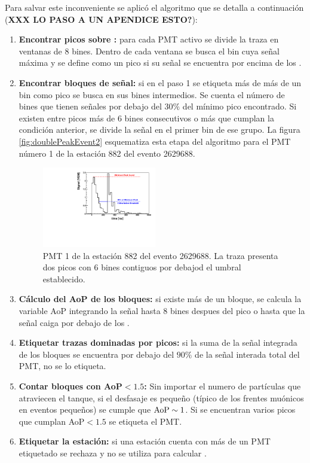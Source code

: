 	Para salvar este inconveniente se aplicó el algoritmo que se detalla a continuación (\textbf{XXX LO PASO A UN APENDICE ESTO?}):
	\begin{enumerate}
	 \item \textbf{Encontrar picos sobre :} para cada PMT activo se divide la traza en ventanas de 8 bines. Dentro de cada ventana se busca el bin cuya señal máxima y se define como un pico si su señal se encuentra por encima de los .
	 \item \textbf{Encontrar bloques de señal:} si en el paso 1 se etiqueta más de más de un bin como pico se busca en sus bines intermedios.
	 Se cuenta el número de bines que tienen señales por debajo del $30\%$ del mínimo pico encontrado. 
	 Si existen entre picos más de 6 bines consecutivos o más que cumplan la condición anterior, se divide la señal en el primer bin de ese grupo.
	 La figura \ref{fig:doublePeakEvent2} esquematiza esta etapa del algoritmo para el PMT número 1 de la estación 882 del evento 2629688.
	 \begin{figure}[ht]
	 \begin{center}
	 \includegraphics[width=0.47\textwidth]{fig/seleccionAuger/ev2629688_pmt1_anode}
	\caption{PMT 1 de la estación 882 del evento 2629688. La traza presenta dos picos con 6 bines contiguos por debajod el umbral establecido.}
	\label{fig:doublePeakEvent}
	\end{center}
	\end{figure}
	 \item \textbf{Cálculo del AoP de los bloques:} si existe más de un bloque, se calcula la variable AoP integrando la señal hasta 8 bines despues del pico o hasta que la señal caiga por debajo de los .
	 \item \textbf{Etiquetar trazas dominadas por picos:} si la suma de la señal integrada de los bloques se encuentra por debajo del $90\%$ de la señal interada total del PMT, no se lo etiqueta.
	 \item \textbf{Contar bloques con AoP$<1.5$:} Sin importar el numero de partículas que atraviecen el tanque, si el desfasaje es pequeño (típico de los frentes muónicos en eventos pequeños) se cumple que ${\rm AoP}\sim 1$. Si se encuentran varios picos que cumplan AoP$<1.5$ se etiqueta el PMT.
	 \item \textbf{Etiquetar la estación:} si una estación cuenta con más de un PMT etiquetado se rechaza y no se utiliza para calcular \aop{}.
	\end{enumerate}

